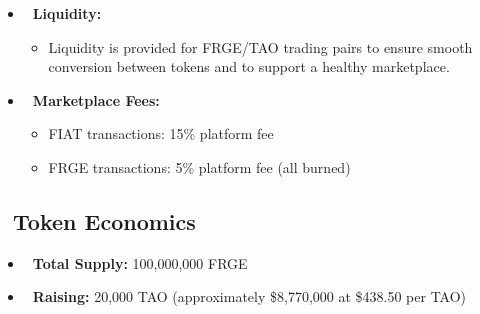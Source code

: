 
\vspace{1em}

\begin{itemize}[leftmargin=*]
    \item \textbf{\textcolor{fabPrimary}{\faCircle\ Liquidity:}}
    \begin{itemize}
        \item Liquidity is provided for FRGE/TAO trading pairs to ensure smooth conversion between tokens and to support a healthy marketplace.
    \end{itemize}
    \item \textbf{\textcolor{fabRed}{\faShoppingCart\ Marketplace Fees:}}
    \begin{itemize}
        \item FIAT transactions: 15\% platform fee
        \item FRGE transactions: 5\% platform fee (all burned)
    \end{itemize}
\end{itemize}

\subsection*{\faLineChart\ Token Economics}
\begin{itemize}[leftmargin=*]
    \item \textbf{\textcolor{fabRed}{\faBitcoin\ Total Supply:}} 100,000,000 FRGE
    \item \textbf{\textcolor{fabAccent}{\faMoney\ Raising:}} 20,000 TAO (approximately \$8,770,000 at \$438.50 per TAO)
\end{itemize}

